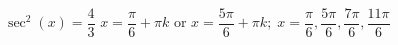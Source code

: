 { $\sec^{2} \left( x \right) = \dfrac{4}{3}$}
{ $x = \dfrac{\pi}{6} + \pi k$ or $x = \dfrac{5\pi}{6} + \pi k; \; x = \dfrac{\pi}{6}, \dfrac{5\pi}{6}, \dfrac{7\pi}{6}, \dfrac{11\pi}{6}$}
